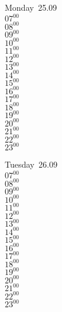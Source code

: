 \documentclass[11pt, a4paper]{book}\usepackage[]{graphicx}\usepackage[]{color}
\begin{document}
\begin{headerbox}
\end{headerbox}
\begin{weekdaybox}
  Monday~25.09\\
  { 
  \vfill
  $07^{00}$\\
$08^{00}$\\
$09^{00}$\\
$10^{00}$\\
$11^{00}$\\
$12^{00}$\\
$13^{00}$\\
$14^{00}$\\
$15^{00}$\\
$16^{00}$\\
$17^{00}$\\
$18^{00}$\\
$19^{00}$\\
$20^{00}$\\
$21^{00}$\\
$22^{00}$\\
$23^{00}$\\
  }
\end{weekdaybox}
\begin{weekdaybox}
  Tuesday~26.09\\
  { 
  \vfill
  $07^{00}$\\
$08^{00}$\\
$09^{00}$\\
$10^{00}$\\
$11^{00}$\\
$12^{00}$\\
$13^{00}$\\
$14^{00}$\\
$15^{00}$\\
$16^{00}$\\
$17^{00}$\\
$18^{00}$\\
$19^{00}$\\
$20^{00}$\\
$21^{00}$\\
$22^{00}$\\
$23^{00}$\\
  }
\end{weekdaybox}
\end{document}

